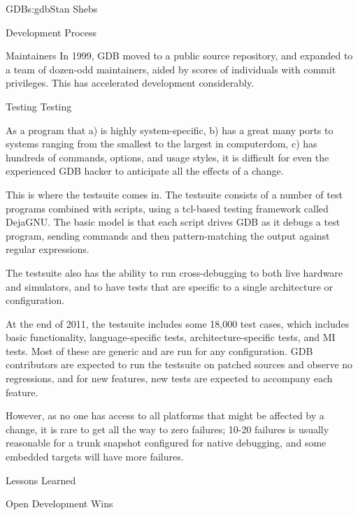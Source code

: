 \begin{aosachapter}{GDB}{s:gdb}{Stan Shebs}
\begin{aosasect1}{Development Process}
\begin{aosasect2}{Maintainers}
In 1999, GDB moved to a public source repository, and expanded to a
team of dozen-odd maintainers, aided by scores of individuals with
commit privileges.  This has accelerated development considerably.

\end{aosasect2}

\begin{aosasect2}{Testing Testing}

As a program that a) is highly system-specific, b) has a great many
ports to systems ranging from the smallest to the largest in
computerdom, c) has hundreds of commands, options, and usage styles,
it is difficult for even the experienced GDB hacker to anticipate all
the effects of a change.

This is where the testsuite comes in.  The testsuite consists of a
number of test programs combined with  scripts, using a
tcl-based testing framework called DejaGNU.  The basic model is that
each script drives GDB as it debugs a test program, sending commands and
then pattern-matching the output against regular expressions.

The testsuite also has the ability to run cross-debugging to both live
hardware and simulators, and to have tests that are specific to a
single architecture or configuration.

At the end of 2011, the testsuite includes some 18,000 test cases,
which includes basic functionality, language-specific tests,
architecture-specific tests, and MI tests.  Most of these are generic
and are run for any configuration.  GDB contributors are expected to
run the testsuite on patched sources and observe no regressions, and
for new features, new tests are expected to accompany each feature.

However, as no one has access to all platforms that might be affected
by a change, it is rare to get all the way to zero failures; 10-20
failures is usually reasonable for a trunk snapshot configured for
native debugging, and some embedded targets will have more failures.

\end{aosasect2}

\end{aosasect1}

\begin{aosasect1}{Lessons Learned}

\begin{aosasect2}{Open Development Wins}


\end{aosasect2}
\end{aosasect1}
\end{aosachapter}
